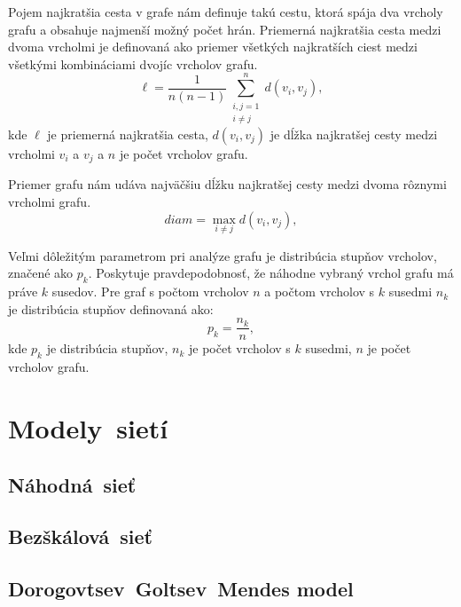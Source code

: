 Pojem najkratšia cesta v grafe nám definuje takú cestu, ktorá spája dva vrcholy grafu a obsahuje najmenší možný počet
hrán. Priemerná najkratšia cesta medzi dvoma vrcholmi je definovaná ako priemer všetkých najkratších ciest medzi
všetkými kombináciami dvojíc vrcholov grafu.	
\begin{equation}
    \ell = \frac{1}{n(n - 1)} \sum_{\substack{i,j = 1 \\ i \ne j}}^{n} d(v_i, v_j),
    \label{eq:avg_shortest_path}
\end{equation}
kde $\ell$ je priemerná najkratšia cesta, $d(v_i, v_j)$ je dĺžka najkratšej cesty medzi vrcholmi $v_i$ a $v_j$ a $n$ je počet vrcholov grafu\cite{barabasi2016network}.

Priemer grafu nám udáva najväčšiu dĺžku najkratšej cesty medzi dvoma rôznymi vrcholmi grafu.
\begin{equation}
    diam = \max_{i \ne j} d(v_i, v_j),
    \label{eq:diameter}
\end{equation}

Veľmi dôležitým parametrom pri analýze grafu je distribúcia stupňov vrcholov, značené ako $p_k$.
Poskytuje pravdepodobnosť, že náhodne vybraný vrchol grafu má práve $k$ susedov\cite{barabasi2016network}.
Pre graf s počtom vrcholov $n$ a počtom vrcholov s $k$ susedmi $n_k$ je distribúcia stupňov definovaná ako:
\begin{equation}
    p_k = \frac{n_k}{n},
    \label{eq:degree_distribution}
\end{equation}
kde $p_k$ je distribúcia stupňov, $n_k$ je počet vrcholov s $k$ susedmi, $n$ je počet vrcholov grafu.

\section{Modely~sietí}\label{sec:network-models}

\subsection{Náhodná~sieť}\label{sec:random-network}

\subsection{Bezškálová~sieť}\label{sec:scale-free-network}

\subsection{Dorogovtsev~Goltsev~Mendes model}\label{sec:dgm-model}

